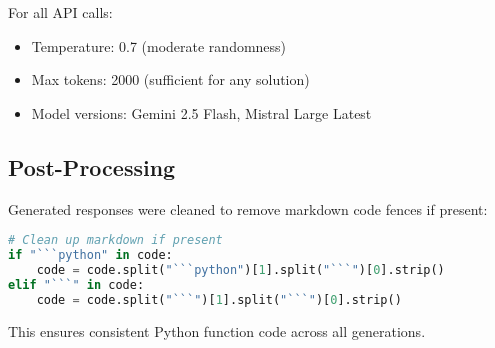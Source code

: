 \documentclass[11pt]{article}
\begin{document}
For all API calls:
\begin{itemize}
    \item Temperature: 0.7 (moderate randomness)
    \item Max tokens: 2000 (sufficient for any solution)
    \item Model versions: Gemini 2.5 Flash, Mistral Large Latest
\end{itemize}

\subsection{Post-Processing}

Generated responses were cleaned to remove markdown code fences if present:
\begin{lstlisting}[language=Python]
# Clean up markdown if present
if "```python" in code:
    code = code.split("```python")[1].split("```")[0].strip()
elif "```" in code:
    code = code.split("```")[1].split("```")[0].strip()
\end{lstlisting}

This ensures consistent Python function code across all generations.
\end{document}
